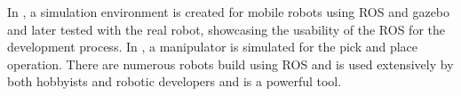 In \cite{takaya2016simulation}, a simulation environment is created for mobile
robots using ROS and gazebo and later tested with the real robot, showcasing the usability of the ROS for the development process.
In \cite{qian2014manipulation}, a manipulator is simulated for the pick and place operation.
There are numerous robots build using ROS and is used extensively by both hobbyists and robotic developers and is a powerful tool.